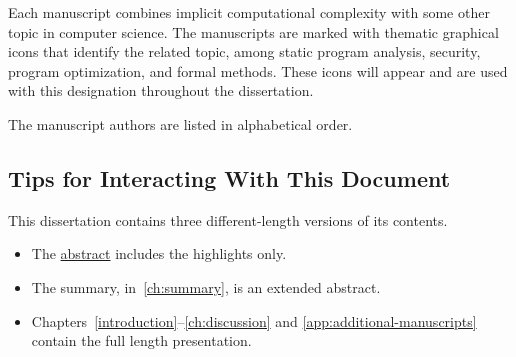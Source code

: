 Each manuscript combines implicit computational complexity with some other topic in computer science.
The manuscripts are marked with thematic graphical icons that identify the related topic, among static program analysis, security, program optimization, and formal methods.
These icons will appear and are used with this designation throughout the dissertation.

The manuscript authors are listed in alphabetical order.



\subsection{Tips for Interacting With This Document}
\label{subsec:tips}

This dissertation contains three different-length versions of its contents.

\begin{itemize}
\item The \hyperref[abs]{abstract} includes the highlights only.
\item The summary, in~\autoref{ch:summary}, is an extended abstract.
\item Chapters~\ref{introduction}--\ref{ch:discussion} and \autoref{app:additional-manuscripts} contain the full length presentation.
\end{itemize}

